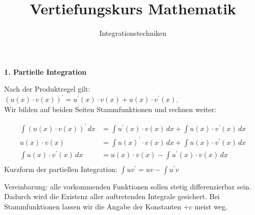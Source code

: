 \usepackage[ngerman]{babel}
\usepackage[utf8]{inputenc}
\usepackage{amsmath}
\usepackage{amssymb}
\usepackage{listings} 
\usepackage{stmaryrd}
\lstset{language=Python, tabsize=4, showstringspaces=false,basicstyle=\footnotesize,mathescape=true} 
\usepackage{mathtools}
\usepackage{ulem}
\usepackage{tikz}

\parskip 10pt
\newcommand{\ggT}{\operatorname{ggT}}
\newcommand{\Mod}[3]{#1\equiv#2\text{ mod }#3}
\newcommand{\tmod}{\text{ mod }}
\newcommand{\ph}{\frac{\pi}{2}}



\title{Vertiefungskurs Mathematik}   
\author{Integrationstechniken} 
\date{}
\frame{\titlepage} 

\begin{frame}[fragile]

\textbf{1. Partielle Integration}  

Nach der Produktregel gilt: $(u(x)\cdot v(x))^{\prime} = u^{\prime}(x) \cdot v(x) + u(x) \cdot v^{\prime}(x)$. \\ \pause
Wir bilden auf beiden Seiten Stammfunktionen und rechnen weiter: \\ \pause

\begin{align*}
\displaystyle\int (u(x)\cdot v(x))^{\prime} \,dx &= \displaystyle\int u^{\prime}(x) \cdot v(x) \,dx + \displaystyle\int u(x) \cdot v^{\prime}(x) \,dx \\  
u(x)\cdot v(x) &= \displaystyle\int u(x)^{\prime} \cdot v(x) \,dx + \displaystyle\int u(x) \cdot v^{\prime}(x)\,dx \\
 \displaystyle\int u(x) \cdot v^{\prime}(x) \,dx  &= u(x)\cdot v(x) -  \displaystyle\int u^{\prime}(x) \cdot v(x) \,dx\\
 \end{align*}  \pause
 Kurzform der partiellen Integration: $\int u v^{\prime} = uv - \int u^{\prime} v$ \pause
 
\footnotesize
Vereinbarung: alle vorkommenden Funktionen sollen stetig differenzierbar sein. Dadurch wird die Existenz aller auftretenden Integrale gesichert. Bei Stammfunktionen lassen wir die Angabe der Konstanten $+c$ meist weg.
\normalsize
\end{frame}

